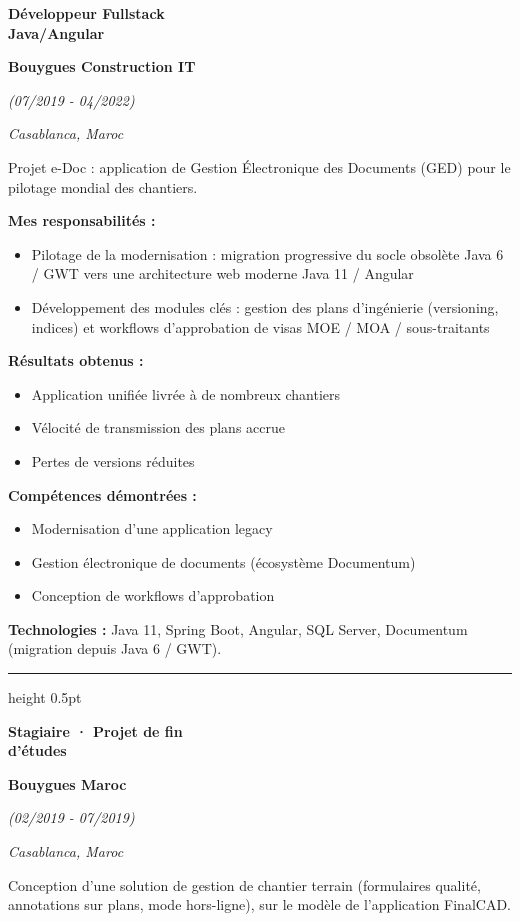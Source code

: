 \documentclass[a4paper,10pt]{article}
\newcommand{\dcsub}[1]{%
  \par\vspace{2.1mm}%
  \noindent\textbf{#1}\par
  \vspace{0.4mm}%
}
\newcommand{\dctech}[1]{%
  \par\vspace{2.0mm}%
  \noindent\textbf{Technologies :} #1\par
}
\newlength{\dcleftw}\setlength{\dcleftw}{51.2mm}
\newlength{\dcgap}\setlength{\dcgap}{2.8mm}
\newcommand{\dcexperience}[2]{%
  \par\noindent
  \begin{minipage}[t]{\dcleftw}
    \raggedright #1
  \end{minipage}%
  \hspace{\dcgap}%
  \begin{minipage}[t]{\dimexpr\textwidth-\dcleftw-\dcgap\relax}
    \raggedright\color{dcbody}#2
  \end{minipage}%
  \par
}
\newcommand{\dcjob}[4]{%
  {\fontsize{11.2}{13.4}\selectfont\bfseries\color{dcnavy}#1}\par
  \vspace{0.7mm}%
  {\fontsize{10}{12}\selectfont\bfseries\color{dcnavy}#2}\par
  \vspace{0.9mm}%
  {\fontsize{8.2}{10}\selectfont\itshape\color{dcmuted}(#3)}\par
  \vspace{0.35mm}%
  {\fontsize{7.8}{9.5}\selectfont\itshape\color{dcgoldsoft}#4}\par
}
\newcommand{\dcrule}{%
  \par\vspace{4.2mm}%
  {\color{dcgold}\hrule height 0.5pt}\par
  \vspace{4.2mm}%
}
\newcommand{\dcfooter}[1]{%
  \vfill
  \noindent{\color{dcgold}\hrule height 0.5pt}\par
  \vspace{2.2mm}%
  \noindent{\fontsize{9}{11}\selectfont\color{dcmuted}#1}%
}
\begin{document}
\dcexperience{%
  \dcjob{Développeur Fullstack\\Java/Angular}%
        {Bouygues Construction IT}%
        {07/2019 - 04/2022}%
        {Casablanca, Maroc}
}{%
  Projet e-Doc : application de Gestion Électronique des Documents (GED) pour le
  pilotage mondial des chantiers.

  \dcsub{Mes responsabilités :}
  \begin{itemize}
    \item Pilotage de la modernisation : migration progressive du socle obsolète Java 6 / GWT
          vers une architecture web moderne Java 11 / Angular
    \item Développement des modules clés : gestion des plans d'ingénierie (versioning,
          indices) et workflows d'approbation de visas MOE / MOA / sous-traitants
  \end{itemize}

  \dcsub{Résultats obtenus :}
  \begin{itemize}
    \item Application unifiée livrée à de nombreux chantiers
    \item Vélocité de transmission des plans accrue
    \item Pertes de versions réduites
  \end{itemize}

  \dcsub{Compétences démontrées :}
  \begin{itemize}
    \item Modernisation d'une application legacy
    \item Gestion électronique de documents (écosystème Documentum)
    \item Conception de workflows d'approbation
  \end{itemize}

  \dctech{Java 11, Spring Boot, Angular, SQL Server, Documentum (migration depuis Java 6 / GWT).}
}

\dcrule

\dcexperience{%
  \dcjob{Stagiaire · Projet de fin\\d'études}%
        {Bouygues Maroc}%
        {02/2019 - 07/2019}%
        {Casablanca, Maroc}
}{%
  Conception d'une solution de gestion de chantier terrain (formulaires qualité,
  annotations sur plans, mode hors-ligne), sur le modèle de l'application FinalCAD.
}

\dcfooter{5}
\end{document}
